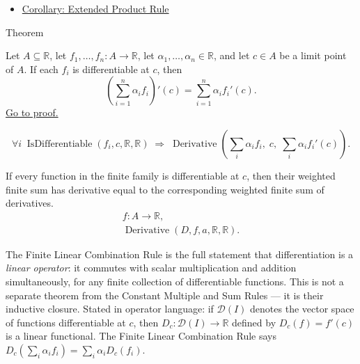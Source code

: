\begin{dependencies}
\begin{itemize}
  \item \hyperref[cor:extended-product-rule]{Corollary: Extended Product Rule}
\end{itemize}
\end{dependencies}


\begin{theorembox}{Theorem}
\begin{theorem}
\label{thm:finite-linear-combination-rule}
Let $A \subseteq \mathbb{R}$, let $f_1, \dots, f_n : A \to \mathbb{R}$, let $\alpha_1, \dots, \alpha_n \in \mathbb{R}$, and let $c \in A$ be a limit point of $A$. If each $f_i$ is differentiable at $c$, then
\[
\left(\sum_{i=1}^{n} \alpha_i f_i\right)'(c) = \sum_{i=1}^{n} \alpha_i f_i'(c).
\]
\hyperref[prf:finite-linear-combination-rule]{Go to proof.}
\end{theorem}
\end{theorembox}

\begin{remark*}
\[
\forall i\;\operatorname{IsDifferentiable}(f_i,c,\mathbb{R},\mathbb{R})
\;\Rightarrow\;
\operatorname{Derivative}\!\left(\textstyle\sum_i\alpha_i f_i,\;c,\;\textstyle\sum_i\alpha_i f_i'(c)\right).
\]
\end{remark*}

\begin{remark*}
If every function in the finite family is differentiable at $c$, then their
weighted finite sum has derivative equal to the corresponding weighted finite
sum of derivatives.
\[
\begin{aligned}
  f\colon A\to\mathbb{R},\\
  \operatorname{Derivative}(D,f,a,\mathbb{R},\mathbb{R}).
\end{aligned}
\]
\end{remark*}

\begin{remark*}[Interpretation]
The Finite Linear Combination Rule is the full statement that differentiation is a \emph{linear operator}: it commutes with scalar multiplication and addition simultaneously, for any finite collection of differentiable functions. This is not a separate theorem from the Constant Multiple and Sum Rules --- it is their inductive closure. Stated in operator language: if $\mathcal{D}(I)$ denotes the vector space of functions differentiable at $c$, then $D_c : \mathcal{D}(I) \to \mathbb{R}$ defined by $D_c(f) = f'(c)$ is a linear functional. The Finite Linear Combination Rule says $D_c(\sum_i \alpha_i f_i) = \sum_i \alpha_i D_c(f_i)$.
\end{remark*}

